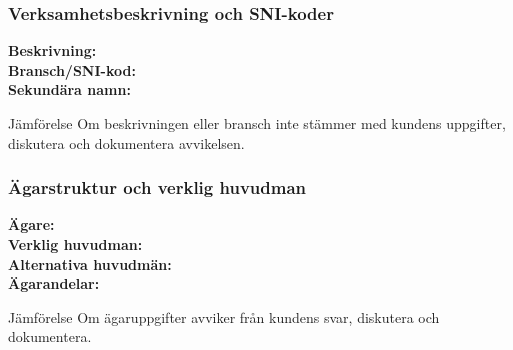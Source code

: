 \documentclass[10pt]{beamer}
\begin{document}

\begin{frame}[label=verksamhetskod]
  \frametitle{Verksamhetsbeskrivning och SNI-koder}
  \small
  \textbf{Beskrivning:} \underline{\hspace{8cm}} \\
  \textbf{Bransch/SNI-kod:} \underline{\hspace{8cm}} \\
  \textbf{Sekundära namn:} \underline{\hspace{8cm}} \\
  \vspace{0.5cm}
  \begin{block}{Jämförelse}
    Om beskrivningen eller bransch inte stämmer med kundens uppgifter, diskutera och dokumentera avvikelsen.
  \end{block}
  \vspace{0.8cm}
  \begin{flushright}
    \hyperlink{nextslide}{}
  \end{flushright}
\end{frame}

\begin{frame}[label=agarstruktur]
  \frametitle{Ägarstruktur och verklig huvudman}
  \small
  \textbf{Ägare:} \underline{\hspace{8cm}} \\
  \textbf{Verklig huvudman:} \underline{\hspace{8cm}} \\
  \textbf{Alternativa huvudmän:} \underline{\hspace{8cm}} \\
  \textbf{Ägarandelar:} \underline{\hspace{8cm}} \\
  \vspace{0.5cm}
  \begin{block}{Jämförelse}
    Om ägaruppgifter avviker från kundens svar, diskutera och dokumentera.
  \end{block}
  \vspace{0.8cm}
  \begin{flushright}
    \hyperlink{nextslide}{}
  \end{flushright}
\end{frame}
\end{document}

